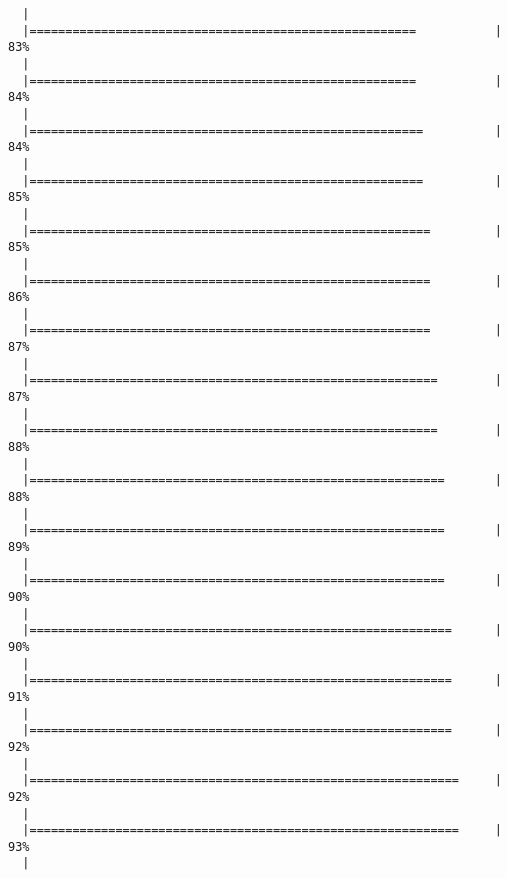 \begin{knitrout}
\begin{kframe}
\begin{verbatim}
  |                                                                       
  |======================================================           |  83%
  |                                                                       
  |======================================================           |  84%
  |                                                                       
  |=======================================================          |  84%
  |                                                                       
  |=======================================================          |  85%
  |                                                                       
  |========================================================         |  85%
  |                                                                       
  |========================================================         |  86%
  |                                                                       
  |========================================================         |  87%
  |                                                                       
  |=========================================================        |  87%
  |                                                                       
  |=========================================================        |  88%
  |                                                                       
  |==========================================================       |  88%
  |                                                                       
  |==========================================================       |  89%
  |                                                                       
  |==========================================================       |  90%
  |                                                                       
  |===========================================================      |  90%
  |                                                                       
  |===========================================================      |  91%
  |                                                                       
  |===========================================================      |  92%
  |                                                                       
  |============================================================     |  92%
  |                                                                       
  |============================================================     |  93%
  |                                                                       

\end{verbatim}
\end{kframe}
\end{knitrout}
